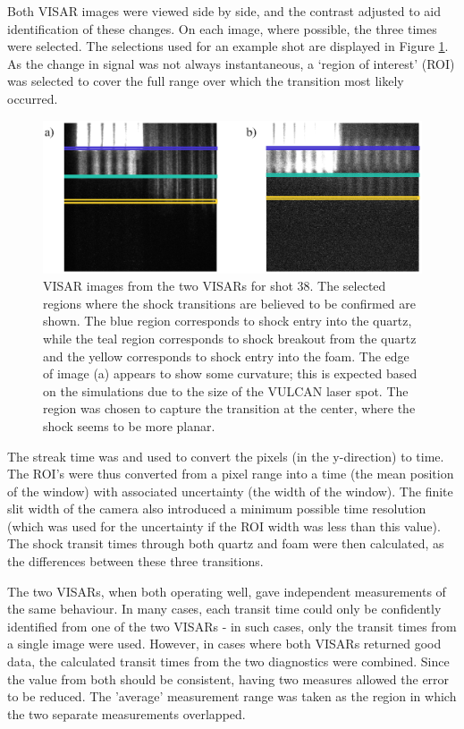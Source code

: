 Both VISAR images were viewed side by side, and the contrast adjusted to aid identification of these changes. On each image, where possible, the three times were selected. The selections used for an example shot are displayed in Figure \ref{fig:VISAR ROI}. As the change in signal was not always instantaneous, a `region of interest' (ROI) was selected to cover the full range over which the transition most likely occurred. 

\begin{figure} [h]
\begin{centering}
\includegraphics[width=1.0\textwidth]{figures/Experiment/VISARROI.eps}%
\caption{\label{fig:VISAR ROI} VISAR images from the two VISARs for shot 38. The selected regions where the shock transitions are believed to be confirmed are shown. The blue region corresponds to shock entry into the quartz, while the teal region corresponds to shock breakout from the quartz and the yellow corresponds to shock entry into the foam. The edge of image (a) appears to show some curvature; this is expected based on the simulations due to the size of the VULCAN laser spot. The region was chosen to capture the transition at the center, where the shock seems to be more planar.}
\end{centering}
\end{figure}

The streak time was and used to convert the pixels (in the y-direction) to time. The ROI's were thus converted from a pixel range into a time (the mean position of the window) with associated uncertainty (the width of the window). The finite slit width of the camera also introduced a minimum possible time resolution (which was used for the uncertainty if the ROI width was less than this value). The shock transit times through both quartz and foam were then calculated, as the differences between these three transitions.

The two VISARs, when both operating well, gave independent measurements of the same behaviour. In many cases, each transit time could only be confidently identified from one of the two VISARs - in such cases, only the transit times from a single image were used. However, in cases where both VISARs returned good data, the calculated transit times from the two diagnostics were combined. Since the value from both should be consistent, having two measures allowed the error to be reduced. The 'average' measurement range was taken as the region in which the two separate measurements overlapped.


